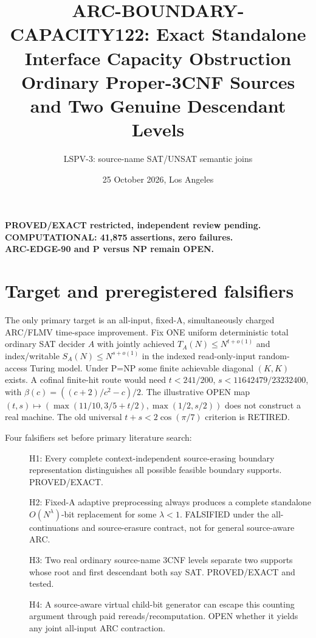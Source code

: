 \documentclass[11pt]{article}
\title{ARC-BOUNDARY-CAPACITY122: Exact Standalone Interface Capacity Obstruction\\
Ordinary Proper-3CNF Sources and Two Genuine Descendant Levels}
\author{LSPV-3: source-name SAT/UNSAT semantic joins}
\date{25 October 2026, Los Angeles}
\begin{document}
\maketitle
\begin{center}
\textbf{PROVED/EXACT restricted, independent review pending.}\\
\textbf{COMPUTATIONAL: 41,875 assertions, zero failures.}\\
\textbf{ARC-EDGE-90 and P versus NP remain OPEN.}
\end{center}
\section{Target and preregistered falsifiers}
The only primary target is an all-input, fixed-A, simultaneously charged
ARC/FLMV time-space improvement. Fix ONE uniform deterministic total
ordinary SAT decider $A$ with jointly achieved
$T_A(N)\le N^{t+o(1)}$ and index/writable
$S_A(N)\le N^{s+o(1)}$ in the indexed
read-only-input random-access Turing model. Under P=NP
some finite achievable diagonal $(K,K)$ exists. A
cofinal finite-hit route would need
$t<241/200$, $s<11642479/23232400$, with
$\beta(c)=((c+2)/c^2-c)/2$.
The illustrative OPEN map
$(t,s)\mapsto(\max(11/10,3/5+t/2),\max(1/2,s/2))$
does not construct a real machine. The old universal
$t+s<2\cos(\pi/7)$ criterion is RETIRED.

Four falsifiers set before primary literature search:
\begin{description}
\item[] H1: Every complete context-independent
source-erasing boundary representation distinguishes
all possible feasible boundary supports. PROVED/EXACT.
\item[] H2: Fixed-A adaptive preprocessing always
produces a complete standalone $O(N^\lambda)$-bit
replacement for some $\lambda<1$. FALSIFIED
under the all-continuations and source-erasure
contract, not for general source-aware ARC.
\item[] H3: Two real ordinary source-name 3CNF
levels separate two supports whose root and first
descendant both say SAT. PROVED/EXACT and tested.
\item[] H4: A source-aware virtual child-bit generator
can escape this counting argument through paid
rereads/recomputation. OPEN whether it yields any
joint all-input ARC contraction.
\end{description}
\end{document}
